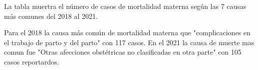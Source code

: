 La tabla muertra el número de casos de mortalidad materna según las 7 causas más comunes del 2018 al 2021. 

Para el 2018 la causa más común de mortalidad materna que "complicaciones en el trabajo de parto y del parto" con 117 casos. En el 2021 la causa de muerte mas comun fue "Otras afecciones obstétricas no clasificadas en otra parte" con 105 casos reportardos. 